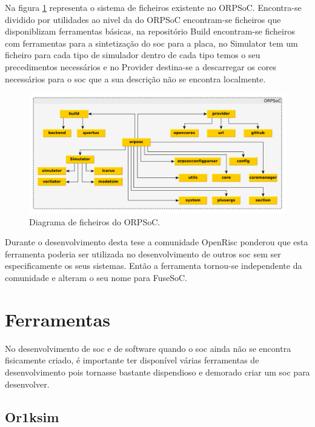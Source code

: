 Na figura \ref{grafos:fusesoc} representa o sistema de ficheiros existente no ORPSoC. Encontra-se dividido por utilidades ao nivel da do ORPSoC encontram-se ficheiros que disponiblizam ferramentas básicas, na repositório Build encontram-se ficheiros com ferramentas para a sintetização do \acrshort{soc} para a placa, no Simulator tem um ficheiro para cada tipo de simulador dentro de cada tipo temos o seu precedimentos necessários e no Provider destina-se a descarregar os cores necessários para o \acrshort{soc} que a sua descrição não se encontra localmente.

\begin{figure}[!htb]
  \centering
  \includegraphics[width=1.00\textwidth]{grafos/Fusesoc.pdf}
  \caption[Diagrama de ficheiros do ORPSoC]{Diagrama de ficheiros do ORPSoC.}
  \label{grafos:fusesoc}
\end{figure}

Durante o desenvolvimento desta tese a comunidade OpenRisc ponderou que esta ferramenta poderia ser utilizada no desenvolvimento de outros \acrshort{soc} sem ser especificamente os seus sistemas. Então a ferramenta tornou-se independente da comunidade e alteram o seu nome para FuseSoC.

\section{Ferramentas}
\label{section:ferramentas}

No desenvolvimento de \acrshort{soc} e de software quando o \acrshort{soc} ainda não se encontra fisicamente criado, é importante ter disponível várias ferramentas de desenvolvimento pois tornasse bastante dispendioso e demorado criar um \acrshort{soc} para desenvolver.

\subsection{Or1ksim}
\label{subs:or1ksim}

